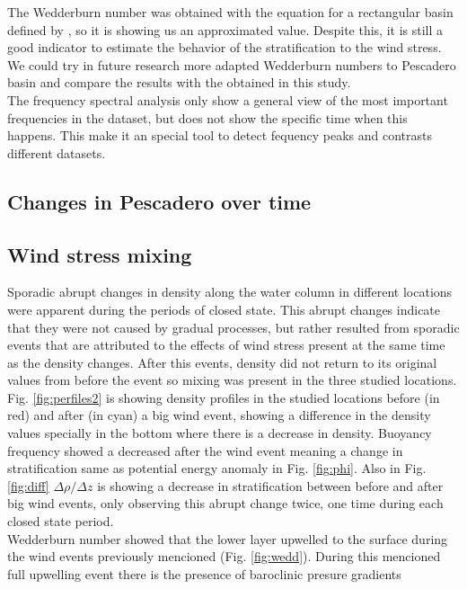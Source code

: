 \documentclass[tesis.tex]{subfiles}
\begin{document}
The Wedderburn number was obtained with the equation for a rectangular basin defined by \cite{Monismith1985}, so it is showing us an approximated value. Despite this, it is still a good indicator to estimate the behavior of the stratification to the wind stress. We could try in future research more adapted Wedderburn numbers to Pescadero basin and compare the results with the obtained in this study.\\

The frequency spectral analysis only show a general view of the most important frequencies in the dataset, but does not show the specific time when this happens. This make it an special tool to detect fequency peaks and contrasts different datasets.\\

\subsection{Changes in Pescadero over time}

\subsection{Wind stress mixing}

Sporadic abrupt changes in density along the water column in different locations were apparent during the periods of closed state. This abrupt changes indicate that they were not caused by gradual processes, but rather resulted from sporadic events that are attributed to the effects of wind stress present at the same time as the density changes. After this events, density did not return to its original values from before the event so mixing was present in the three studied locations.\\

Fig. \ref{fig:perfiles2} is showing density profiles in the studied locations before (in red) and after (in cyan) a big wind event, showing a difference in the density values specially in the bottom where there is a decrease in density. Buoyancy frequency showed a decreased after the wind event meaning a change in stratification same as potential energy anomaly in Fig. \ref{fig:phi}. Also in Fig. \ref{fig:diff} $\Delta \rho/\Delta z$ is showing a decrease in stratification between before and after big wind events, only observing this abrupt change twice, one time during each closed state period.\\

Wedderburn number showed that the lower layer upwelled to the surface during the wind events previously mencioned (Fig. \ref{fig:wedd}). During this mencioned full upwelling event there is the presence of baroclinic presure gradients
\end{document}
